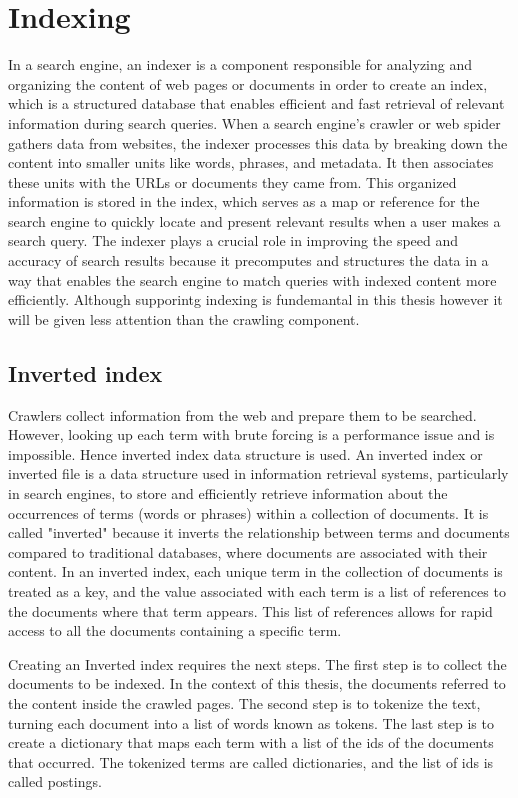 \section{Indexing}
In a search engine, an indexer is a component responsible for analyzing and organizing the content of web pages or documents in order to create an index, which is a structured database that enables efficient and fast retrieval of relevant information during search queries.
When a search engine's crawler or web spider gathers data from websites, the indexer processes this data by breaking down the content into smaller units like words, phrases, and metadata. It then associates these units with the URLs or documents they came from. This organized information is stored in the index, which serves as a map or reference for the search engine to quickly locate and present relevant results when a user makes a search query.
The indexer plays a crucial role in improving the speed and accuracy of search results because it precomputes and structures the data in a way that enables the search engine to match queries with indexed content more efficiently. Although supporintg indexing is fundemantal in this thesis however it will be given less attention than the crawling component. 

\subsection{Inverted index}
Crawlers collect information from the web and prepare them to be searched. However, looking up each term with brute forcing is a performance issue and is impossible. Hence inverted index data structure is used. 
An inverted index or inverted file is a data structure used in information retrieval systems, particularly in search engines, to store and efficiently retrieve information about the occurrences of terms (words or phrases) within a collection of documents. It is called "inverted" because it inverts the relationship between terms and documents compared to traditional databases, where documents are associated with their content.
In an inverted index, each unique term in the collection of documents is treated as a key, and the value associated with each term is a list of references to the documents where that term appears. This list of references allows for rapid access to all the documents containing a specific term.

Creating an Inverted index requires the next steps. The first step is to collect the documents to be indexed. In the context of this thesis, the documents referred to the content inside the crawled pages. The second step is to tokenize the text, turning each document into a list of words known as tokens. The last step is to create a dictionary that maps each term with a list of the ids of the documents that occurred. The tokenized terms are called dictionaries, and the list of ids is called postings. 

